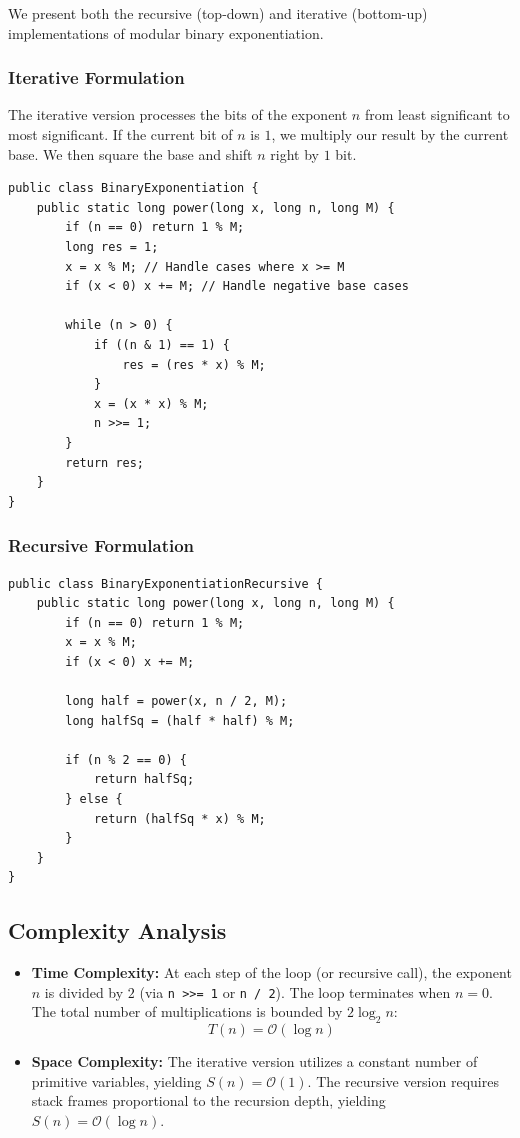 \documentclass[10pt,journal,compsoc,onecolumn]{IEEEtran}
\begin{document}
We present both the recursive (top-down) and iterative (bottom-up) implementations of modular binary exponentiation.

\subsubsection{Iterative Formulation}

The iterative version processes the bits of the exponent $n$ from least significant to most significant. If the current bit of $n$ is $1$, we multiply our result by the current base. We then square the base and shift $n$ right by $1$ bit.

\begin{verbatim}
public class BinaryExponentiation {
    public static long power(long x, long n, long M) {
        if (n == 0) return 1 % M;
        long res = 1;
        x = x % M; // Handle cases where x >= M
        if (x < 0) x += M; // Handle negative base cases
        
        while (n > 0) {
            if ((n & 1) == 1) {
                res = (res * x) % M;
            }
            x = (x * x) % M;
            n >>= 1;
        }
        return res;
    }
}
\end{verbatim}

\subsubsection{Recursive Formulation}

\begin{verbatim}
public class BinaryExponentiationRecursive {
    public static long power(long x, long n, long M) {
        if (n == 0) return 1 % M;
        x = x % M;
        if (x < 0) x += M;
        
        long half = power(x, n / 2, M);
        long halfSq = (half * half) % M;
        
        if (n % 2 == 0) {
            return halfSq;
        } else {
            return (halfSq * x) % M;
        }
    }
}
\end{verbatim}

\subsection{Complexity Analysis}

\begin{itemize}
    \item \textbf{Time Complexity:} At each step of the loop (or recursive call), the exponent $n$ is divided by $2$ (via \texttt{n >{}>= 1} or \texttt{n / 2}). The loop terminates when $n = 0$. The total number of multiplications is bounded by $2 \log_2 n$:
    \begin{equation}
    T(n) = \mathcal{O}(\log n)
    \end{equation}
    \item \textbf{Space Complexity:} The iterative version utilizes a constant number of primitive variables, yielding $S(n) = \mathcal{O}(1)$. The recursive version requires stack frames proportional to the recursion depth, yielding $S(n) = \mathcal{O}(\log n)$.
\end{itemize}
\end{document}
